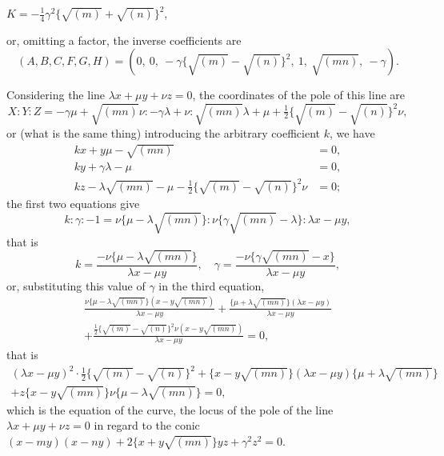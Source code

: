 \documentclass[11pt,a4paper]{article}
\theoremstyle{plain}
\begin{document}
$K = -\tfrac{1}{4}\gamma^2\{\sqrt{(m)} + \sqrt{(n)}\}^2$,

or, omitting a factor, the inverse coefficients are
\begin{equation}
(A, B, C, F, G, H) = (0,\ 0,\ -\gamma\{\sqrt{(m)} - \sqrt{(n)}\}^2,\ 1,\ \sqrt{(mn)},\ -\gamma).
\end{equation}

\newpage
\setcounter{equation}{11}

Considering the line $\lambda x + \mu y + \nu z = 0$, the coordinates of the pole of this line are
\begin{equation}
X : Y : Z = -\gamma\mu + \sqrt{(mn)}\nu : -\gamma\lambda + \nu : \sqrt{(mn)}\lambda + \mu + \tfrac{1}{2}\{\sqrt{(m)} - \sqrt{(n)}\}^2\nu,
\end{equation}
or (what is the same thing) introducing the arbitrary coefficient $k$, we have
\begin{align}
kx + y\mu - \sqrt{(mn)} &= 0, \\
ky + \gamma\lambda - \mu &= 0, \\
kz - \lambda\sqrt{(mn)} - \mu - \tfrac{1}{2}\{\sqrt{(m)} - \sqrt{(n)}\}^2\nu &= 0;
\end{align}
the first two equations give
\begin{equation}
k : \gamma : -1 = \nu\{\mu - \lambda\sqrt{(mn)}\} : \nu\{\gamma\sqrt{(mn)} - \lambda\} : \lambda x - \mu y,
\end{equation}
that is
\begin{equation}
k = \frac{-\nu\{\mu - \lambda\sqrt{(mn)}\}}{\lambda x - \mu y}, \quad \gamma = \frac{-\nu\{\gamma\sqrt{(mn)} - x\}}{\lambda x - \mu y},
\end{equation}
or, substituting this value of $\gamma$ in the third equation,
\begin{multline}
\frac{\nu\{\mu - \lambda\sqrt{(mn)}\}(x - y\sqrt{(mn)})}{\lambda x - \mu y} + \frac{\{\mu + \lambda\sqrt{(mn)}\}(\lambda x - \mu y)}{\lambda x - \mu y} \\
+ \frac{\tfrac{1}{2}\{\sqrt{(m)} - \sqrt{(n)}\}^2\nu(x - y\sqrt{(mn)})}{\lambda x - \mu y} = 0,
\end{multline}
that is
\begin{multline}
(\lambda x - \mu y)^2 \cdot \tfrac{1}{2}\{\sqrt{(m)} - \sqrt{(n)}\}^2 + \{x - y\sqrt{(mn)}\}(\lambda x - \mu y)\{\mu + \lambda\sqrt{(mn)}\} \\
+ z\{x - y\sqrt{(mn)}\}\nu\{\mu - \lambda\sqrt{(mn)}\} = 0,
\end{multline}
which is the equation of the curve, the locus of the pole of the line $\lambda x + \mu y + \nu z = 0$ in regard to the conic $(x-my)(x-ny) + 2\{x + y\sqrt{(mn)}\}yz + \gamma^2 z^2 = 0$.
\end{document}
